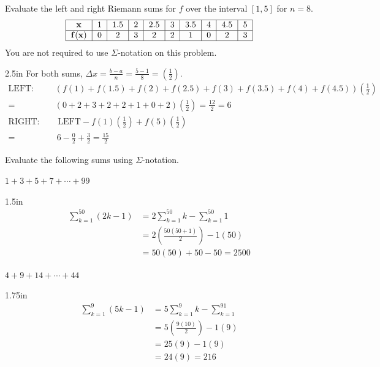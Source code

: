 \documentclass[12pt, addpoints]{exam}
\newcommand{\vect}[1]{\mathbf{#1}}
\newcommand{\vstr}{\vspace{\stretch{1}}}
\theoremstyle{plain}
\begin{document}
\begin{questions}
\question[10] Evaluate the left and right Riemann sums for $f$ over the interval $[1,5]$ for $n=8$.  
\[
\begin{tabular}{ |c|c|c|c|c|c|c|c|c|c| } 
 \hline
 $\vect x$ & 1 & 1.5 & 2 & 2.5 & 3 & 3.5 & 4 & 4.5 & 5 \\ 
 \hline
 $\vect{f(x)}$ & 0 & 2 & 3 & 2 & 2 & 1 & 0 & 2 & 3 \\ 
 \hline
\end{tabular}
\]
You are not required to use $\Sigma$-notation on this problem. 
\begin{solutionbox}
{2.5in}
For both sums, $\Delta x=\frac{b-a}{n}=\frac{5-1}{8}=\left(\frac{1}{2}\right)$.
\vspace{-1pc}
\begin{align*}
\text{LEFT:}\quad & \left(f(1)+f(1.5)+f(2)+f(2.5)+f(3)+f(3.5)+f(4)+f(4.5)\right)\left(\frac{1}{2}\right) \\
	=& \left(0+2+3+2+2+1+0+2\right)\left(\frac{1}{2}\right)=\frac{12}{2}=\boxed{6} \\[0.2pc]
\text{RIGHT:}\quad & \text{ LEFT}-f(1)\left(\frac{1}{2}\right)+f(5)\left(\frac{1}{2}\right) \\[0.2pc]
		= & \ 6-\frac{0}{2}+\frac{3}{2} = \boxed{\frac{15}{2}}
\end{align*}
\end{solutionbox}
\vstr

\newpage
  Evaluate the following sums using $\Sigma$-notation.
 
\begin{parts}
\bonuspart[2] $1+3+5+7+\cdots +99$
\begin{solutionbox}
{1.5in}
\vspace{-1.75pc}
\begin{align*}
\sum_{k=1}^{50}(2k-1) &= 2\sum_{k=1}^{50}k-\sum_{k=1}^{50}1 \\[0.2pc]
	&= 2\left(\frac{50(50+1)}{2}\right)-1(50) \\[0.1pc]
	&= 50(50)+50-50 = \boxed{2500}
\end{align*}
\end{solutionbox}
\vstr

\bonuspart[3] $4+9+14+\cdots +44$
\begin{solutionbox}
{1.75in}
\vspace{-1.75pc}
\begin{align*}
\sum_{k=1}^9(5k-1) &= 5\sum_{k=1}^9k-\sum_{k=1}^91 \\[0.2pc]
	&= 5\left(\frac{9(10)}{2}\right)-1(9) \\[0.1pc]
	&= 25(9)-1(9) \\
	&= 24(9)=\boxed{216}
\end{align*}
\end{solutionbox}
\vstr


\end{parts}
\end{questions}
\end{document}

